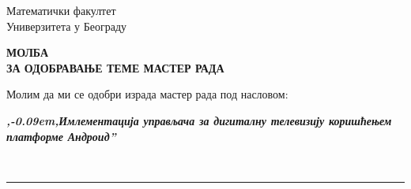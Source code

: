 \documentclass[a4paper]{article}
\def\zn{,\kern-0.09em,}
\begin{document}
\thispagestyle{empty}

\begin{flushleft}
Математички факултет\\
Универзитета у Београду
\end{flushleft}

\bigskip

\begin{center}
\textbf{МОЛБА\\
ЗА ОДОБРАВАЊЕ ТЕМЕ МАСТЕР РАДА
}\end{center}

\bigskip

\begin{flushleft}
Молим да ми се одобри израда мастер рада под насловом:
\end{flushleft}

\begin{minipage}{16.5cm}
\textbf{\textit{\zn Имлементација управљача за дигиталну телевизију коришћењем платформе Андроид''}}
\end{minipage}\\
\rule[1mm]{17.5cm}{.05mm}
\end{document}
